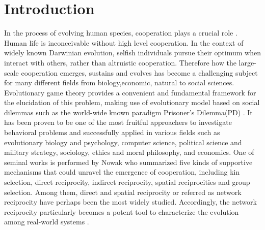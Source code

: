 \documentclass[preprint,12pt,3p]{elsarticle}
\begin{document}
\section{Introduction}
    In the process of evolving human species, cooperation plays a
crucial role \cite{hammerstein2003genetic,hofbauer1998evolutionary}.
Human life is inconceivable without high level cooperation.
In the context of widely known Darwinian evolution, selfish individuals pursue
their optimum when interact with others, rather than altruistic cooperation.
Therefore how the large-scale cooperation emerges, sustains and evolves has become a
challenging subject for many different fields from biology,economic, natural to social sciences.
    Evolutionary game theory\cite{smith1982evolution,nowakevolutionary} provides a convenient
and fundamental framework for the elucidation of this problem,
making use of evolutionary model based on social dilemmas such as the world-wide known paradigm Prisoner's Dilemma(PD)
\cite{Trivers-18254,RapoportChammah-18253,FundenbergMaskin-18255,KendallYao-18256}.
It has been proven to be one of the most fruitful approachers to investigate behavioral problems and successfully applied in various fields such as evolutionary biology and psychology,
computer science, political science and military strategy, sociology,
ethics and moral philosophy, and economics\cite{NowakSigmund-18283,PoncelaGómez-Gardeñes-18278,Tanimoto-18277,
ImhofFudenberg-18279,SantosPacheco-18280,Gracia-LázaroCuesta-18281,AntonioniTomassini-18282,
TanimotoBrede-18276}.
    One of seminal works is performed by Nowak \cite{Nowak-18317}who summarized five kinds of supportive mechanisms
that could unravel the emergence of cooperation, including kin selection, direct reciprocity,
indirect reciprocity, spatial reciprocities and group selection.
Among them, direct and spatial reciprocity or referred as network reciprocity have perhaps been the
most widely studied.
Accordingly, the network reciprocity particularly  becomes a potent tool to characterize the evolution
among real-world systems \cite{boccaletti2006complex}.
\end{document}
